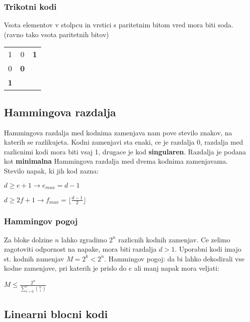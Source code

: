 \documentclass{article}
\begin{document}
\begin{multicols}{3}
\subsubsection{Trikotni kodi}
Vsota elementov v stolpcu in vrstici s paritetnim bitom vred mora biti soda. (ravno tako vsota paritetnih bitov)
\begin{center}
    \begin{tabular}{ ccc } 
        1   & 0 & \textbf{1} \\ 
        0   & \textbf{0} &  \\ 
        \textbf{1}   &  &  \\ 
    \end{tabular}
\end{center}

\subsection{Hammingova razdalja}
Hammingova razdalja med kodnima zamenjava nam pove stevilo znakov, na katerih se razlikujeta. Kodni zamenjavi sta enaki,
ce je razdalja 0, razdalja med razlicnimi kodi mora biti vsaj 1, drugace je kod \textbf{singularen}.
Razdalja je podana kot \textbf{minimalna} Hammingova razdalja med dvema kodnima zamenjavama.
Stevilo napak, ki jih kod zazna:
\begin{center}
    $d \geq e + 1 \rightarrow e_{max} = d-1$
\end{center}
\begin{center}
    $d \geq 2f + 1 \rightarrow f_{max} = \lfloor \frac{d-1}{2} \rfloor$
\end{center}

\subsubsection{Hammingov pogoj}
Za bloke dolzine $n$ lahko zgradimo $2^n$ razlicnih kodnih zamenjav. Ce zelimo zagotoviti odpornost na napake,
mora biti razdalja $d > 1$. Uporabni kodi imajo st. kodnih zamenjav $M = 2^k < 2^n$.
Hammingov pogoj: da bi lahko dekodirali vse kodne zamenjave, pri katerih je prislo do $e$ ali manj napak
mora veljati:
\begin{center}
    \begin{math}
        M \leq \frac{2^n}{\sum_{i=0}^e{n \choose i}}
    \end{math}
\end{center}

\subsection{Linearni blocni kodi}

\end{multicols}
\end{document}
